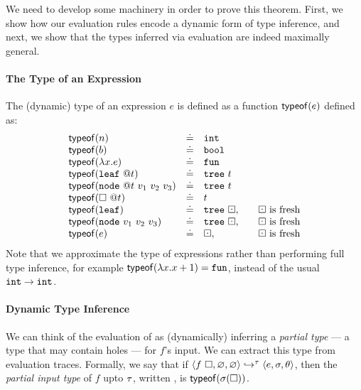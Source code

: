 We need to develop some machinery in order to prove this theorem.
First, we show how our evaluation rules encode a dynamic form of
type inference, and next, we show that the types inferred via
evaluation are indeed maximally general.

\paragraph{The Type of an Expression} The (dynamic) type of an
expression $e$ is defined as a function $\mathsf{typeof}(e)$ defined as:
  \[
  \begin{array}{lcll}
    \typeof{n}   & \defeq & \tint & \\
    \typeof{b}   & \defeq & \tbool & \\
    \typeof{\efun{x}{e}} & \defeq & \tfun \\
    \typeof{\vleaf{t}} & \defeq & \ttree{t} \\
    \typeof{\vnode{t}{v_1}{v_2}{v_3}} & \defeq & \ttree{t} \\
    \typeof{\vhole{t}} & \defeq & t \\
    \typeof{\eleaf} & \defeq & \ttree{\thole}, & \quad \text{\thole is fresh} \\
    \typeof{\enode{v_1}{v_2}{v_3}} & \defeq & \ttree{\thole}, & \quad \text{\thole is fresh} \\
    \typeof{e} & \defeq & \thole, & \quad \text{\thole is fresh} \\
  \end{array}
  \]
%
Note that we approximate the type of expressions rather than
performing full type inference, for example
$\mathsf{typeof}(\lambda x. x + 1) = \mathtt{fun}$,
instead of the usual $\mathtt{int} \rightarrow \mathtt{int}$.

\paragraph{Dynamic Type Inference}
We can think of the evaluation of  as (dynamically)
inferring a \emph{partial type} --- a type that may contain holes ---
for $f$'s input.
%
We can extract this type from evaluation traces.
%
Formally, we say that if
$\langle f\ \square{}, \varnothing, \varnothing \rangle \hookrightarrow^{\tau} \langle e, \sigma, \theta \rangle$,
then the \emph{partial input type} of $f$ upto $\tau$, written
, is
$\mathsf{typeof}(\sigma(\square{}))$.
%

